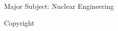 \begin{titlepage}
\begin{singlespace}
\begin{tabular}{ll}
\end{tabular}
\end{singlespace}
\vspace{4em}

\begin{center}
\tamugradmonth \hspace{2pt} \tamugradyear

\vspace{3em}

Major Subject: Nuclear Engineering \par
\vspace{3em}
Copyright \tamugradyear
\par\end{center}
\end{titlepage}
\pagebreak{}




